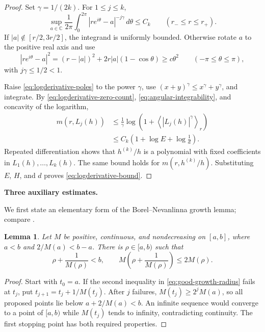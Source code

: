 \documentclass[12pt,letterpaper,reqno]{amsart}
\newtheorem{lem}[thm]{Lemma}
\theoremstyle{definition}
\numberwithin{equation}{section}
\newcommand{\C}{\mathbb C}
\newcommand{\dd}{\,d}
\newcommand{\mean}[2]{\left\langle #1\right\rangle_{#2}}
\begin{document}
\begin{proof}
		Set $\gamma=1/(2k)$. For $1\le j\le k$,
		\begin{equation}\label{eq:angular-integrability}
			\sup_{a\in\C}\frac1{2\pi}\int_0^{2\pi}
			|re^{i\theta}-a|^{-j\gamma}\dd\theta\le C_k
			\qquad(r_-\le r\le r_+).
		\end{equation}
		If $|a|\notin[r/2,3r/2]$, the integrand is uniformly bounded.
		Otherwise rotate $a$ to the positive real axis and use
		\[
		|re^{i\theta}-a|^2
		=(r-|a|)^2+2r|a|(1-\cos\theta)\ge c\theta^2
		\qquad(-\pi\le\theta\le\pi),
		\]
		with $j\gamma\le1/2<1$.
		
		Raise \eqref{eq:logderivative-poles} to the power $\gamma$, use
		$(x+y)^\gamma\le x^\gamma+y^\gamma$, and integrate.
		By \eqref{eq:logderivative-zero-count},
		\eqref{eq:angular-integrability}, and concavity of the logarithm,
		\[
		\begin{split}
			m(r,L_j(h))
			&\le\frac1\gamma
			\log\left(1+\mean{|L_j(h)|^\gamma}{r}\right)\\
			&\le C_k\left(1+\log E+\log\frac1d\right).
		\end{split}
		\]
		Repeated differentiation shows that $h^{(k)}/h$ is a polynomial
		with fixed coefficients in $L_1(h),\ldots,L_k(h)$.
		The same bound holds for $m(r,h^{(k)}/h)$.
		Substituting $E$, $H$, and $d$ proves
		\eqref{eq:logderivative-bound}.
	\end{proof}
	
	\medskip\noindent\textbf{Three auxiliary estimates.}
	
	We first state an elementary form of the Borel--Nevanlinna growth
	lemma; compare \cite[Chap. VI, Lemma 3.7]{Lan87}.
	
	\begin{lem}\label{lem:growth}
		Let $M$ be positive, continuous, and nondecreasing on $[a,b]$, where
		$a<b$ and $2/M(a)<b-a$. There is $\rho\in[a,b)$ such that
		\begin{equation}\label{eq:good-growth-radius}
			\rho+\frac1{M(\rho)}<b,\qquad
			M\left(\rho+\frac1{M(\rho)}\right)\le2M(\rho).
		\end{equation}
	\end{lem}
	
	\begin{proof}
		Start with $t_0=a$. If the second inequality in
		\eqref{eq:good-growth-radius} fails at $t_j$, put
		$t_{j+1}=t_j+1/M(t_j)$.
		After $j$ failures, $M(t_j)\ge2^jM(a)$, so all proposed points lie
		below $a+2/M(a)<b$.
		An infinite sequence would converge to a point of $[a,b)$ while
		$M(t_j)$ tends to infinity, contradicting continuity.
		The first stopping point has both required properties.
	\end{proof}
	
\end{document}
